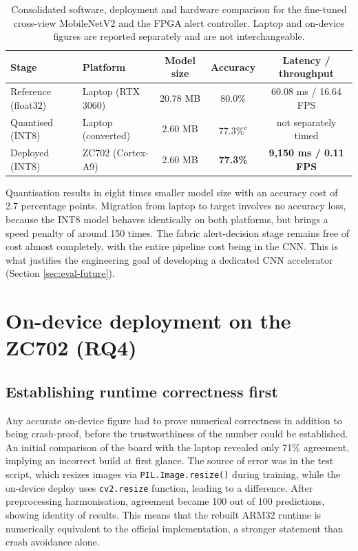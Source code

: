 \begin{table}[H]
\centering
\caption{Consolidated software, deployment and hardware comparison for the fine-tuned cross-view MobileNetV2 and the FPGA alert controller. Laptop and on-device figures are reported separately and are not interchangeable.}
\label{tab:consolidated}
\footnotesize
\begin{tabular}{llccc}
\toprule
\textbf{Stage} & \textbf{Platform} & \textbf{Model size} & \textbf{Accuracy} & \textbf{Latency / throughput} \\
\midrule
Reference (float32) & Laptop (RTX 3060) & 20.78 MB & 80.0\% & 60.08 ms / 16.64 FPS \\
Quantised (INT8) & Laptop (converted) & 2.60 MB & 77.3\%\textsuperscript{c} & not separately timed \\
Deployed (INT8) & ZC702 (Cortex-A9) & 2.60 MB & \textbf{77.3\%} & \textbf{9{,}150 ms / 0.11 FPS} \\
\bottomrule
\end{tabular}
\end{table}

Quantisation results in eight times smaller model size with an accuracy cost of 2.7 percentage points. Migration from laptop to target involves no accuracy loss, because the INT8 model behaves identically on both platforms, but brings a speed penalty of around 150 times. The fabric alert-decision stage remains free of cost almost completely, with the entire pipeline cost being in the CNN. This is what justifies the engineering goal of developing a dedicated CNN accelerator (Section \ref{sec:eval-future}).

\section{On-device deployment on the ZC702 (RQ4)}
\label{sec:qr-ondevice}

\subsection{Establishing runtime correctness first}
\label{sec:qr-runtime-correctness}

Any accurate on-device figure had to prove numerical correctness in addition to being crash-proof, before the trustworthiness of the number could be established. An initial comparison of the board with the laptop revealed only 71\% agreement, implying an incorrect build at first glance. The source of error was in the test script, which resizes images via \texttt{PIL.Image.resize()} during training, while the on-device deploy uses \texttt{cv2.resize} function, leading to a difference. After preprocessing harmonisation, agreement became 100 out of 100 predictions, showing identity of results. This means that the rebuilt ARM32 runtime is numerically equivalent to the official implementation, a stronger statement than crash avoidance alone.


